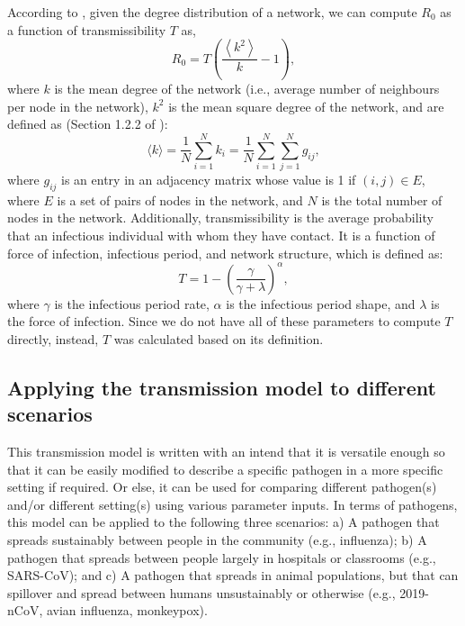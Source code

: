 \documentclass[a4paper]{article}
\begin{document}
	According to \cite{Meyers2005JTheoBiol}, given the degree distribution of a network, we can compute $R_0$ as a function of transmissibility $T$ as,
	\begin{equation}
	R_0 = T\left (\frac{\left \langle k^2 \right \rangle}{k}-1\right),
	\end{equation}
	where $k$ is the mean degree of the network (i.e., average number of neighbours per node in the network), $k^2$ is the mean square degree of the network, and are defined as (Section 1.2.2 of \cite{Kiss2017}):
	\begin{equation}\label{equ: degree}
	\langle k\rangle = \frac{1}{N}\sum_{i=1}^{N}k_i=\frac{1}{N}\sum_{i=1}^{N}\sum_{j=1}^{N}g_{ij},
	\end{equation}
	where $g_{ij}$ is an entry in an adjacency matrix whose value is 1 if $(i,j) \in E$, where $E$ is a set of pairs of nodes in the network, and $N$ is the total number of nodes in the network. Additionally, transmissibility is the average probability that an infectious individual with whom they have contact. It is a function of force of infection, infectious period, and network structure, which is defined as\cite{Kahn2018ClinTrials}:
	\begin{equation}\label{equ: transmissibility}
	T = 1-\left(\frac{\gamma}{\gamma+\lambda}\right)^\alpha,
	\end{equation}
	where $\gamma$ is the infectious period rate, $\alpha$ is the infectious period shape, and $\lambda$ is the force of infection. Since we do not have all of these parameters to compute $T$ directly, instead, $T$ was calculated based on its definition.
	
	\subsection{Applying the transmission model to different scenarios}
	\label{sec:Example}
	This transmission model is written with an intend that it is versatile enough so that it can be easily modified to describe a specific pathogen in a more specific setting if required. Or else, it can be used for comparing different pathogen(s) and/or different setting(s) using various parameter inputs. In terms of pathogens, this model can be applied to the following three scenarios: a) A pathogen that spreads sustainably between people in the community (e.g., influenza); b) A pathogen that spreads between people largely in hospitals or classrooms (e.g., SARS-CoV); and c) A pathogen that spreads in animal populations, but that can spillover and spread between humans unsustainably or otherwise (e.g., 2019-nCoV, avian influenza, monkeypox). 
	
\end{document}
